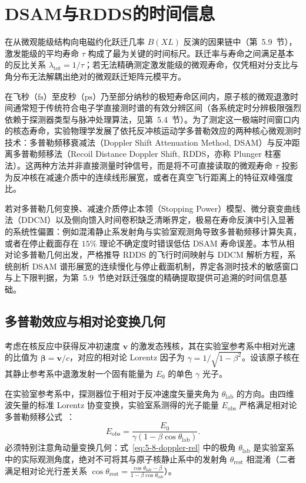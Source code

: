 \section{DSAM与RDDS的时间信息}\label{sec:5-8}

在从微观能级结构向电磁约化跃迁几率 $B(XL)$ 反演的因果链中（第~5.9~节），激发能级的平均寿命 $\tau$ 构成了最为关键的时间标尺。跃迁率与寿命之间满足基本的反比关系 $\lambda_{\mathrm{tot}} = 1/\tau$；若无法精确测定激发能级的微观寿命，仅凭相对分支比与角分布无法解耦出绝对的微观跃迁矩阵元模平方。

在飞秒（$\text{fs}$）至皮秒（$\text{ps}$）乃至部分纳秒的极短寿命区间内，原子核的微观退激时间通常短于传统符合电子学直接测时谱的有效分辨区间（各系统定时分辨极限强烈依赖于探测器类型与脉冲处理算法，见第~5.4~节）。为了测定这一极端时间窗口内的核态寿命，实验物理学发展了依托反冲核运动学多普勒效应的两种核心微观测时技术：多普勒频移衰减法（Doppler Shift Attenuation Method, DSAM）与反冲距离多普勒频移法（Recoil Distance Doppler Shift, RDDS，亦称 Plunger 柱塞法）。这两种方法并非直接测量时钟信号，而是将不可直接读取的微观寿命 $\tau$ 投影为反冲核在减速介质中的连续线形展宽，或者在真空飞行距离上的特征双峰强度比。

若对多普勒几何变换、减速介质停止本领（Stopping Power）模型、微分衰变曲线法（DDCM）以及侧向馈入时间卷积缺乏清晰界定，极易在寿命反演中引入显著的系统性偏置：例如混淆静止系发射角与实验室观测角导致多普勒频移计算失真，或者在停止截面存在 $15\%$ 理论不确定度时错误低估 DSAM 寿命误差。本节从相对论多普勒几何出发，严格推导 RDDS 的飞行时间映射与 DDCM 解析方程，系统剖析 DSAM 谱形展宽的连续慢化与停止截面机制，界定各测时技术的敏感窗口与上下限判据，为第~5.9~节绝对跃迁强度的精确提取提供可追溯的时间信息基础。

\subsection{多普勒效应与相对论变换几何}\label{subsec:5-8-1}

考虑在核反应中获得反冲初速度 $\mathbf{v}$ 的激发态残核，其在实验室参考系中相对光速的比值为 $\boldsymbol{\beta} = \mathbf{v}/c$，对应的相对论 Lorentz 因子为 $\gamma = 1/\sqrt{1 - \beta^2}$。设该原子核在其静止参考系中退激发射一个固有能量为 $E_0$ 的单色 $\gamma$ 光子。

在实验室参考系中，探测器位于相对于反冲速度矢量夹角为 $\theta_{\mathrm{lab}}$ 的方向。由四维波矢量的标准 Lorentz 协变变换，实验室系测得的光子能量 $E_{\mathrm{obs}}$ 严格满足相对论多普勒频移公式~\cite{dewald-2012-ddcm-recoil-distance}：
\begin{equation}\label{eq:5-8-doppler-rel}
E_{\mathrm{obs}} = \frac{E_0}{\gamma (1 - \beta \cos\theta_{\mathrm{lab}})}.
\end{equation}
必须特别注意角动量变换几何：式~\eqref{eq:5-8-doppler-rel} 中的极角 $\theta_{\mathrm{lab}}$ 是实验室系中的实际观测角度，绝对不可将其与原子核静止系中的发射角 $\theta_{\mathrm{rest}}$ 相混淆（二者满足相对论光行差关系 $\cos\theta_{\mathrm{rest}} = \frac{\cos\theta_{\mathrm{lab}} - \beta}{1 - \beta\cos\theta_{\mathrm{lab}}}$）。

